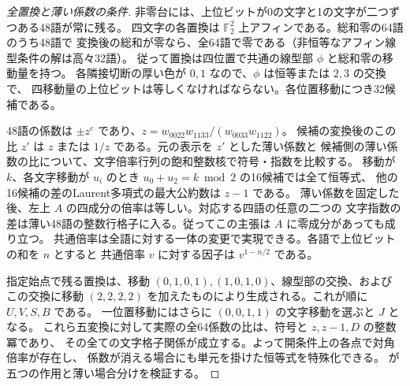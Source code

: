 \begin{proof}[全置換と薄い係数の条件]
非零台には、上位ビットが0の文字と1の文字が二つずつある48語が常に残る。
四文字の各置換は $\mathbb F_2^2$ 上アフィンである。総和零の64語のうち48語で
変換後の総和が零なら、全64語で零である（非恒等なアフィン線型条件の解は高々32語）。
従って置換は四位置で共通の線型部 $\phi$ と総和零の移動量を持つ。
各隣接切断の厚い色が $0,1$ なので、$\phi$ は恒等または $2,3$ の交換で、
四移動量の上位ビットは等しくなければならない。各位置移動につき32候補である。

48語の係数は $\pm z^e$ であり、$z=w_{0022}w_{1133}/(w_{0033}w_{1122})$。
候補の変換後のこの比 $z'$ は $z$ または $1/z$ である。元の表示を $z'$ とした薄い係数と
候補側の薄い係数の比について、文字倍率行列の飽和整数核で符号・指数を比較する。
移動が $k$、各文字移動が $u_i$ のとき $u_0+u_2=k\bmod2$ の16候補では全て恒等式、
他の16候補の差のLaurent多項式の最大公約数は $z-1$ である。
薄い係数を固定した後、左上 $A$ の四成分の倍率は等しい。対応する四語の任意の二つの
文字指数の差は薄い48語の整数行格子に入る。従ってこの主張は $A$ に零成分があっても成り立つ。
共通倍率は全語に対する一体の変更で実現できる。各語で上位ビットの和を $n$ とすると
共通倍率 $v$ に対する因子は $v^{1-n/2}$ である。

指定始点で残る置換は、移動 $(0,1,0,1),(1,0,1,0)$、線型部の交換、および
この交換に移動 $(2,2,2,2)$ を加えたものにより生成される。これが順に $U,V,S,B$ である。
一位置移動にはさらに $(0,0,1,1)$ の文字移動を選ぶと $J$ となる。
これら五変換に対して実際の全64係数の比は、符号と $z,z-1,D$ の整数冪であり、
その全ての文字格子関係が成立する。よって開条件上の各点で対角倍率が存在し、
係数が消える場合にも単元を掛けた恒等式を特殊化できる。
 が五つの作用と薄い場合分けを検証する。
\end{proof}

